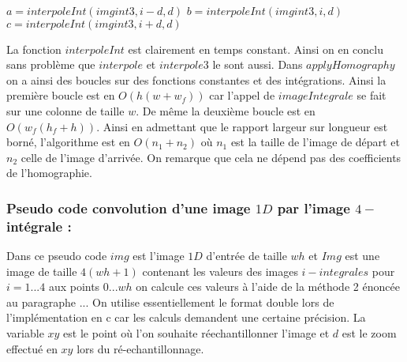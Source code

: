 \begin{algorithm}[H]
\caption{$interpoleTripleInt(imgint3,i,d)$}
$a=interpoleInt(imgint3,i-d,d)$\;
$b=interpoleInt(imgint3,i,d)$\;
$c=interpoleInt(imgint3,i+d,d)$\;
\end{algorithm}


La fonction $interpoleInt$ est clairement en temps constant. Ainsi on en conclu sans problème que $interpole$ et $interpole3$ le sont aussi. Dans $applyHomography$ on a ainsi des boucles sur des fonctions constantes et des intégrations. Ainsi la première boucle est en $O(h(w+w_f))$ car l'appel de $imageIntegrale$ se fait sur une colonne de taille $w$. De même la deuxième boucle est en $O(w_f(h_f+h))$.
\medbreak
Ainsi en admettant que le rapport largeur sur longueur est borné, l'algorithme est en $O(n_1+n_2)$ où $n_1$ est la taille de l'image de départ et $n_2$ celle de l'image d'arrivée. On remarque que cela ne dépend pas des coefficients de l'homographie.

\subsubsection{Pseudo code convolution d'une image $1D$ par l'image $4-$intégrale :}
 Dans ce pseudo code $img$ est l'image $1D$ d'entrée de taille $wh$ et $Img$ est une image de taille $4(wh+1)$ contenant les valeurs des images $i-integrales$ pour $i=1...4$ aux points $0...wh$ on calcule ces valeurs à l'aide de la méthode 2 énoncée au paragraphe ...
 On utilise essentiellement le format double lors de l'implémentation en c car les calculs demandent une certaine précision. La variable $xy$ est le point où l'on souhaite réechantillonner l'image et $d$ est le zoom effectué en $xy$ lors du ré-echantillonnage.
 
 \begin{algorithm}
 \caption{$build4Integrale(img,Img)$}
 \end{algorithm}
 
